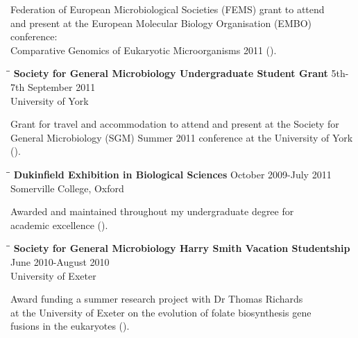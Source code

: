 \documentclass{res}
\begin{document}
\begin{resume}
\begin{tabbing}
   \end{tabbing}\vspace{-30pt}      

   Federation of European Microbiological Societies (FEMS) grant to attend\\ and present at the European Molecular Biology Organisation (EMBO) conference: \\ Comparative Genomics of Eukaryotic Microorganisms 2011 ().

 
\vspace{-0.1in}  
   \begin{tabbing}
   \hspace{2in}\= \hspace{2.6in}\= \kill
    {\bf Society for General Microbiology Undergraduate Student Grant} \> \> 5th-7th September 2011\\
                            \> 
                            \> University of York \\

   \end{tabbing}\vspace{-30pt}      
   Grant for travel and accommodation to attend and present at the Society for \\ General Microbiology (SGM) Summer 2011 conference at the University of York (). 

 
   \begin{tabbing}
   \hspace{2in}\= \hspace{2.6in}\= \kill 
    {\bf Dukinfield Exhibition in Biological Sciences} \> \>        October 2009-July 2011\\
                                               
                                               \> \> Somerville College, Oxford \\
   \end{tabbing}\vspace{-30pt}     
   Awarded and maintained throughout my undergraduate degree for \\academic excellence ().

\vspace{-0.1in}  
   \begin{tabbing}
   \hspace{2in}\= \hspace{2.6in}\= \kill 
    {\bf Society for General Microbiology Harry Smith Vacation Studentship} \> \>June 2010-August 2010\\
                            \> 
                            \> University of Exeter\\
   \end{tabbing}\vspace{-30pt}     
      Award funding a summer research project with Dr Thomas Richards \\
       at the University of Exeter on the evolution of folate biosynthesis gene \\
       fusions in the eukaryotes ().


\end{resume}
\end{document}
